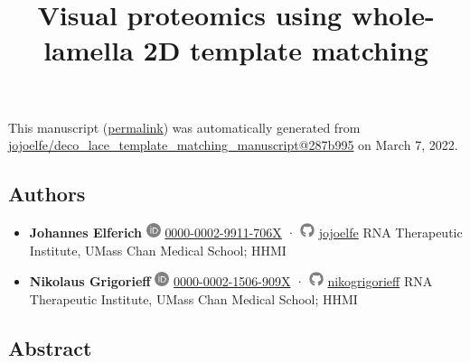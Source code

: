 \documentclass[
]{article}
\title{Visual proteomics using whole-lamella 2D template matching}
\author{}
\date{}
\begin{document}
\maketitle

This manuscript
(\href{https://jojoelfe.github.io/deco_lace_template_matching_manuscript/v/287b9950fc2bff7878d36aa1cbf2cb7f2082f798/}{permalink})
was automatically generated
from \href{https://github.com/jojoelfe/deco_lace_template_matching_manuscript/tree/287b9950fc2bff7878d36aa1cbf2cb7f2082f798}{jojoelfe/deco\_lace\_template\_matching\_manuscript@287b995}
on March 7, 2022.

\hypertarget{authors}{%
\subsection{Authors}\label{authors}}

\begin{itemize}
\item
  \textbf{Johannes Elferich}
  \includegraphics[width=0.16667in,height=0.16667in]{images/orcid.pdf}
  \href{https://orcid.org/0000-0002-9911-706X}{0000-0002-9911-706X}
  · \includegraphics[width=0.16667in,height=0.16667in]{images/github.pdf}
  \href{https://github.com/jojoelfe}{jojoelfe}
  RNA Therapeutic Institute, UMass Chan Medical School; HHMI
\item
  \textbf{Nikolaus Grigorieff}
  \includegraphics[width=0.16667in,height=0.16667in]{images/orcid.pdf}
  \href{https://orcid.org/0000-0002-1506-909X}{0000-0002-1506-909X}
  · \includegraphics[width=0.16667in,height=0.16667in]{images/github.pdf}
  \href{https://github.com/nikogrigorieff}{nikogrigorieff}
  RNA Therapeutic Institute, UMass Chan Medical School; HHMI
\end{itemize}

\hypertarget{abstract}{%
\subsection{Abstract}\label{abstract}}
\end{document}
